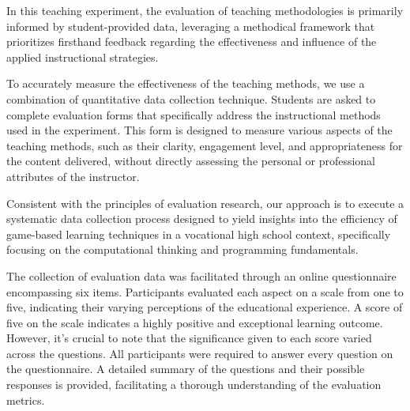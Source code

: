 \documentclass[final,5p,times,twocolumn,authoryear]{elsarticle}
\begin{document}
In this teaching experiment, the evaluation of teaching methodologies is primarily informed by student-provided data, leveraging a methodical framework that prioritizes firsthand feedback regarding the effectiveness and influence of the applied instructional strategies. 

To accurately measure the effectiveness of the teaching methods, we use a combination of quantitative data collection technique. 
Students are asked to complete evaluation forms that specifically address the instructional methods used in the experiment. This form is designed to measure various aspects of the teaching methods, such as their clarity, engagement level, and appropriateness for the content delivered, without directly assessing the personal or professional attributes of the instructor.

Consistent with the principles of evaluation research, our approach is to execute a systematic data collection process designed to yield insights into the efficiency of game-based learning techniques in a vocational high school context, specifically focusing on the computational thinking and programming fundamentals.
\citep{powell2006evaluation}

The collection of evaluation data was facilitated through an online questionnaire encompassing six items. Participants evaluated each aspect on a scale from one to five, indicating their varying perceptions of the educational experience. 
A score of five on the scale indicates a highly positive and exceptional learning outcome. However, it's crucial to note that the significance given to each score varied across the questions. All participants were required to answer every question on the questionnaire. A detailed summary of the questions and their possible responses is provided, facilitating a thorough understanding of the evaluation metrics.
\end{document}

